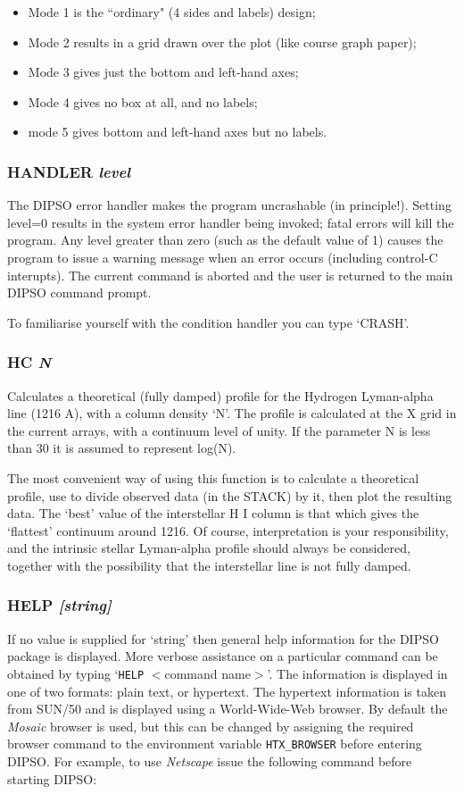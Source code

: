 \documentclass[twoside,11pt,noabs,nolof]{starlink}
\providecommand{\dipcom}[3]{\subsubsection*{\label{COM:#1}\xlabel{COM:#1}\textbf{#1} \emph{#2}}}
\begin{document}
\begin{itemize}
\item Mode 1 is the ``ordinary" (4 sides and labels) design;
\item Mode 2 results in a grid drawn over the plot (like course graph paper);
\item Mode 3 gives just the bottom and left-hand axes;
\item Mode 4 gives no box at all, and no labels;
\item mode 5 gives bottom and left-hand axes but no labels.
\end{itemize}

\dipcom{HANDLER}{level}{Switches the DIPSO error handler on and off}
The DIPSO error handler makes the program uncrashable (in principle!). Setting
level=0 results in the system error handler being invoked; fatal errors will
kill the program. Any level greater than zero (such as the default value of 1)
causes the
program to issue a warning message when an error occurs (including control-C
interupts). The current command is aborted and the user is returned to the main
DIPSO command prompt.

To familiarise yourself with the condition handler you can type `CRASH'.


\dipcom{HC}{N}{Creates a theoretical profile for the Hydrogen Lyman-alpha line}
Calculates a theoretical (fully damped) profile for the Hydrogen
Lyman-alpha line (1216 A), with a column density `N'. The profile is
calculated at the X grid in the current arrays, with a continuum level
of unity. If the parameter N is less than 30 it is assumed to
represent log(N).

The most convenient way of using this function is to calculate a
theoretical profile, use   to divide observed data (in the STACK)
by it, then plot the resulting data. The `best' value of the
interstellar H I column is that which gives the `flattest' continuum
around 1216. Of course, interpretation is your responsibility, and the
intrinsic stellar Lyman-alpha profile should always be considered,
together with the possibility that the interstellar line is not fully
damped.

\dipcom{HELP}{[string]}{Displays full help on specified commands}
If no value is supplied for `string' then general help information for
the DIPSO package is displayed. More verbose assistance on a particular
command can be obtained by typing `{\texttt{HELP} $<$command name$>$}'. The
information is displayed in one of two formats: plain text, or hypertext.
The hypertext information is taken from SUN/50 and is displayed using a
World-Wide-Web browser. By default the \emph{Mosaic} browser is used, but
this can be changed by assigning the required browser command to the
environment variable \texttt{HTX\_BROWSER} before entering DIPSO. For
example, to use \emph{Netscape} issue the following command before
starting DIPSO:
\end{document}
